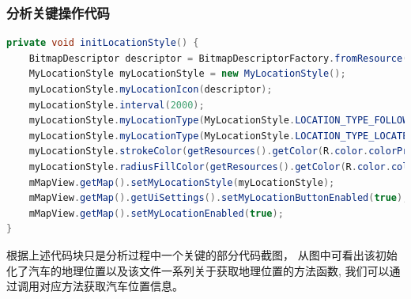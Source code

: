 \subsubsection{分析关键操作代码}
\begin{lstlisting}[language=Java,title={获取汽车初始化地理位置代码}]
  private void initLocationStyle() {
    BitmapDescriptor descriptor = BitmapDescriptorFactory.fromResource(R.drawable.main_location_icon);
    MyLocationStyle myLocationStyle = new MyLocationStyle();
    myLocationStyle.myLocationIcon(descriptor);
    myLocationStyle.interval(2000); 
    myLocationStyle.myLocationType(MyLocationStyle.LOCATION_TYPE_FOLLOW);
    myLocationStyle.myLocationType(MyLocationStyle.LOCATION_TYPE_LOCATE);
    myLocationStyle.strokeColor(getResources().getColor(R.color.colorPrimary));
    myLocationStyle.radiusFillColor(getResources().getColor(R.color.colorPrimary_50));
    mMapView.getMap().setMyLocationStyle(myLocationStyle);
    mMapView.getMap().getUiSettings().setMyLocationButtonEnabled(true);
    mMapView.getMap().setMyLocationEnabled(true);
}
  \end{lstlisting}
根据上述代码块只是分析过程中一个关键的部分代码截图，
从图中可看出该初始化了汽车的地理位置以及该文件一系列关于获取地理位置的方法函数,
我们可以通过调用对应方法获取汽车位置信息。
